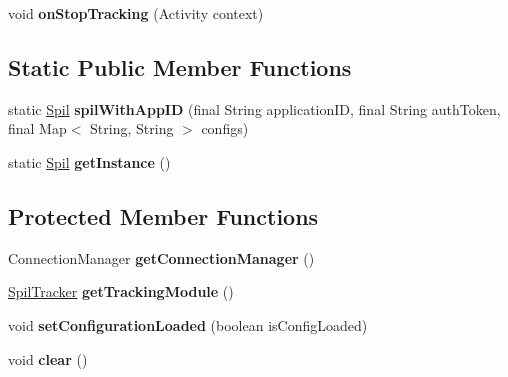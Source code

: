 \begin{DoxyCompactItemize}
\item 
\hypertarget{classcom_1_1spilgames_1_1framework_1_1_spil_ab0a87193a15dae6a8ae69fa088f084ae}{void {\bfseries on\-Stop\-Tracking} (Activity context)}\label{classcom_1_1spilgames_1_1framework_1_1_spil_ab0a87193a15dae6a8ae69fa088f084ae}

\end{DoxyCompactItemize}
\subsection*{Static Public Member Functions}
\begin{DoxyCompactItemize}
\item 
\hypertarget{classcom_1_1spilgames_1_1framework_1_1_spil_a53b66029328f2db58c408ef2a059c2b8}{static \hyperlink{classcom_1_1spilgames_1_1framework_1_1_spil}{Spil} {\bfseries spil\-With\-App\-I\-D} (final String application\-I\-D, final String auth\-Token, final Map$<$ String, String $>$ configs)}\label{classcom_1_1spilgames_1_1framework_1_1_spil_a53b66029328f2db58c408ef2a059c2b8}

\item 
\hypertarget{classcom_1_1spilgames_1_1framework_1_1_spil_a95d9a2464dbd2ee00c37cdd5b4ce338a}{static \hyperlink{classcom_1_1spilgames_1_1framework_1_1_spil}{Spil} {\bfseries get\-Instance} ()}\label{classcom_1_1spilgames_1_1framework_1_1_spil_a95d9a2464dbd2ee00c37cdd5b4ce338a}

\end{DoxyCompactItemize}
\subsection*{Protected Member Functions}
\begin{DoxyCompactItemize}
\item 
\hypertarget{classcom_1_1spilgames_1_1framework_1_1_spil_a254be5d716b3e02c78bcc532cfc2255e}{Connection\-Manager {\bfseries get\-Connection\-Manager} ()}\label{classcom_1_1spilgames_1_1framework_1_1_spil_a254be5d716b3e02c78bcc532cfc2255e}

\item 
\hypertarget{classcom_1_1spilgames_1_1framework_1_1_spil_a5958cfcda620dbcfd46676fab06fff1f}{\hyperlink{interfacecom_1_1spilgames_1_1framework_1_1tracking_1_1_spil_tracker}{Spil\-Tracker} {\bfseries get\-Tracking\-Module} ()}\label{classcom_1_1spilgames_1_1framework_1_1_spil_a5958cfcda620dbcfd46676fab06fff1f}

\item 
\hypertarget{classcom_1_1spilgames_1_1framework_1_1_spil_af8295a0dceaaae813a96ea6650e85db7}{void {\bfseries set\-Configuration\-Loaded} (boolean is\-Config\-Loaded)}\label{classcom_1_1spilgames_1_1framework_1_1_spil_af8295a0dceaaae813a96ea6650e85db7}

\item 
\hypertarget{classcom_1_1spilgames_1_1framework_1_1_spil_a7eb74a75c249e97a09bc075ac8decd3d}{void {\bfseries clear} ()}\label{classcom_1_1spilgames_1_1framework_1_1_spil_a7eb74a75c249e97a09bc075ac8decd3d}

\end{DoxyCompactItemize}


